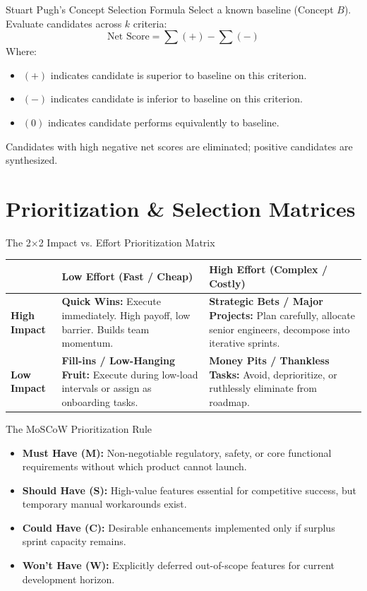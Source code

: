 \begin{metricbox}{Stuart Pugh's Concept Selection Formula}
Select a known baseline (Concept $B$). Evaluate candidates across $k$ criteria:
\[
\text{Net Score} = \sum (+) - \sum (-)
\]
Where:
\begin{itemize}
    \item $(+)$ indicates candidate is superior to baseline on this criterion.
    \item $(-)$ indicates candidate is inferior to baseline on this criterion.
    \item $(0)$ indicates candidate performs equivalently to baseline.
\end{itemize}
Candidates with high negative net scores are eliminated; positive candidates are synthesized.
\end{metricbox}

\section{Prioritization \& Selection Matrices}

\begin{canvasbox}{The 2$\times$2 Impact vs. Effort Prioritization Matrix}
\begin{tabularx}{\linewidth}{|l|X|X|} \hline
 & \textbf{Low Effort (Fast / Cheap)} & \textbf{High Effort (Complex / Costly)} \\ \hline
\textbf{High Impact} & \textbf{Quick Wins:} Execute immediately. High payoff, low barrier. Builds team momentum. & \textbf{Strategic Bets / Major Projects:} Plan carefully, allocate senior engineers, decompose into iterative sprints. \\ \hline
\textbf{Low Impact} & \textbf{Fill-ins / Low-Hanging Fruit:} Execute during low-load intervals or assign as onboarding tasks. & \textbf{Money Pits / Thankless Tasks:} Avoid, deprioritize, or ruthlessly eliminate from roadmap. \\ \hline
\end{tabularx}
\end{canvasbox}

\begin{frameworkbox}{The MoSCoW Prioritization Rule}
\begin{itemize}
    \item \textbf{Must Have (M):} Non-negotiable regulatory, safety, or core functional requirements without which product cannot launch.
    \item \textbf{Should Have (S):} High-value features essential for competitive success, but temporary manual workarounds exist.
    \item \textbf{Could Have (C):} Desirable enhancements implemented only if surplus sprint capacity remains.
    \item \textbf{Won't Have (W):} Explicitly deferred out-of-scope features for current development horizon.
\end{itemize}
\end{frameworkbox}
